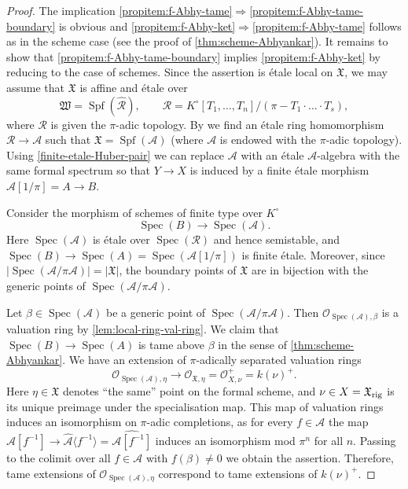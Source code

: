 \documentclass[a4paper,twoside,11pt,reqno]{amsart}
\newcommand{\cO}{{\mathcal O}}
\newcommand{\fX}{{\mathfrak{X}}}
\newcommand{\la}{\longrightarrow}
\DeclareMathOperator{\Spec}{Spec}
\DeclareMathOperator{\Spf}{Spf}
\theoremstyle{definition}
\numberwithin{equation}{subsection}
\begin{document}
\begin{proof}
The implication \ref{propitem:f-Abhy-tame}$\Rightarrow$\ref{propitem:f-Abhy-tame-boundary} is obvious and  \ref{propitem:f-Abhy-ket}$\Rightarrow$\ref{propitem:f-Abhy-tame} follows as in the scheme case (see the proof of \cref{thm:scheme-Abhyankar}). It remains to show that  \ref{propitem:f-Abhy-tame-boundary} implies \ref{propitem:f-Abhy-ket} by reducing to the case of schemes. Since the assertion is \'etale local on $\fX$, we may assume that $\fX$ is affine and \'etale over 
\[
    \mathfrak{W} = \Spf(\widehat{\mathcal{R}}), \qquad \mathcal{R} = K^\circ[T_1, \ldots, T_n]/(\pi - T_1\cdot\ldots\cdot T_s),
\]
where $\mathcal{R}$ is given the $\pi$-adic topology. By \cite[Corollary~1.7.3(iii)]{HuberBook} we find an \'etale ring homomorphism $\mathcal{R}\to \mathcal{A}$ such that $\fX = \Spf(\mathcal{A})$ (where $\mathcal{A}$ is endowed with the $\pi$-adic topology). Using \cref{finite-etale-Huber-pair} we can replace $\mathcal{A}$ with an \'etale $\mathcal{A}$-algebra with the same formal spectrum so that $Y\to X$ is induced by a finite \'etale morphism $\mathcal{A}[1/\pi]=A\to B$.

Consider the morphism of schemes of finite type over $K^\circ$
\[ 
    \Spec(B) \la \Spec(\mathcal{A}).
\]
Here $\Spec(\mathcal{A})$ is \'etale over $\Spec(\mathcal{R})$ and hence semistable, and $\Spec(B)\to \Spec(A) = \Spec(\mathcal{A}[1/\pi])$ is finite \'etale. Moreover, since $|\Spec(\mathcal{A}/\pi \mathcal{A})| = |\fX|$, the boundary points of $\fX$ are in bijection with the generic points of $\Spec(\mathcal{A}/\pi \mathcal{A})$. 

Let $\beta \in \Spec(\mathcal{A})$ be a generic point of $\Spec(\mathcal{A}/\pi \mathcal{A})$. Then $\cO_{\Spec(\mathcal{A}), \beta}$ is a valuation ring by \cref{lem:local-ring-val-ring}. We claim that $\Spec(B)\to \Spec(A)$ is tame above $\beta$ in the sense of \cref{thm:scheme-Abhyankar}. We have an extension of $\pi$-adically separated valuation rings 
\[ 
    \cO_{\Spec(\mathcal{A}), \eta} \la \cO_{\fX, \eta} = \cO_{X, \nu}^+ = k(\nu)^+.
\]
Here $\eta\in \fX$ denotes ``the same'' point on the formal scheme, and $\nu\in X = \fX_{\rm rig}$ is its unique preimage under the specialisation map. This map of valuation rings induces an isomorphism on $\pi$-adic completions, as for every $f\in \mathcal{A}$ the map $\mathcal{A}[f^{-1}]\to \widehat{\mathcal{A}}\langle f^{-1}\rangle = \widehat{\mathcal{A}[f^{-1}]}$  induces an isomorphism mod $\pi^n$ for all $n$. Passing to the colimit over all $f\in \mathcal{A}$ with $f(\beta)\neq 0$ we obtain the assertion. Therefore, tame extensions of $\cO_{\Spec(\mathcal{A}), \eta}$ correspond to tame extensions of $k(\nu)^+$.  


\end{proof}
\end{document}
